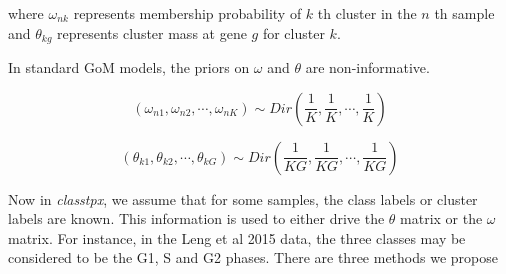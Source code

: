 \documentclass[12pt]{article}\usepackage[]{graphicx}\usepackage[usenames,dvipsnames]{color}
\newcommand{\classtpx}{\textit{classtpx}}
\begin{document}
where $\omega_{nk}$ represents membership probability of $k$ th cluster in the $n$ th sample and $\theta_{kg}$ represents cluster mass at gene $g$ for cluster $k$.

In standard GoM models, the priors on $\omega$ and $\theta$ are non-informative.

\begin{equation}
\left(\omega_{n1}, \omega_{n2}, \cdots, \omega_{nK} \right) \sim Dir \left ( \frac{1}{K}, \frac{1}{K}, \cdots, \frac{1}{K} \right)
\end{equation}

\begin{equation}
\left(\theta_{k1}, \theta_{k2}, \cdots, \theta_{kG} \right) \sim Dir \left ( \frac{1}{KG}, \frac{1}{KG}, \cdots, \frac{1}{KG} \right)
\end{equation}

Now in \classtpx{}, we assume that for some samples, the class labels or cluster labels are known. 
This information is used to either drive the $\theta$ matrix or the $\omega$ matrix. For instance, in the Leng et al 2015 data, the three classes may be considered to be the G1, S and G2 phases. There are three methods we propose 
\end{document}
